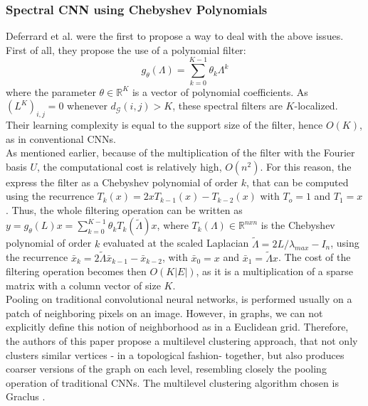 \subsubsection*{Spectral CNN using Chebyshev Polynomials}
Deferrard et al. \cite{defferard} were the first to propose a way to deal with
the above issues.\\
 First of all, they propose the use of a polynomial filter:\\
\begin{equation}
g_{\theta}(\Lambda ) = \sum_{k=0}^{K-1}\theta_k \Lambda^k
\end{equation}
where the parameter $\theta \in \mathbb{R}^K$ is a vector of polynomial
coefficients. As $(L^K)_{i,j} = 0$ whenever $d_{\mathcal{G}}(i,j)>K$, these
spectral filters are $K$-localized.\\
 Their learning complexity is equal to the support
size of the filter, hence $O(K)$, as in conventional CNNs.\\
 As mentioned earlier, because of the
multiplication of the filter with the Fourier basis $U$, the computational cost
is relatively high, $O(n^2)$. For this reason, the express the filter as a
Chebyshev polynomial of order $k$, that can be computed using the recurrence
$T_k(x) = 2xT_{k-1}(x)-T_{k-2}(x)$ with $T_o = 1$ and $T_1 = x$. Thus, the whole
filtering operation can be written as $y = g_{\theta}(L)x =
\sum_{k=0}^{K-1}\theta_k T_k (\widetilde{\Lambda })x$, where $T_k (\Lambda ) \in
\mathbb{R}^{nxn}$ is the Chebyshev polynomial of order $k$ evaluated at the
scaled Laplacian $\widetilde{\Lambda} = 2L/\lambda_{max} - I_n$, using the
recurrence $\bar{x}_k = 2\widetilde{\Lambda}\bar{x}_{k-1} - \bar{x}_{k-2}$, with
$\bar{x}_0 = x$ and $\bar{x}_1 = \widetilde{\Lambda}x$. The cost of the
filtering operation becomes then $O(K|E|)$, as it is a multiplication of a
sparse matrix with a column vector of size $K$.\\
Pooling on traditional convolutional neural networks, is performed usually on a
patch of neighboring pixels on an image. However, in graphs, we can not explicitly
define this notion of neighborhood as in a Euclidean grid. Therefore, the authors of
this paper propose a multilevel clustering approach, that not only clusters
similar vertices - in a topological fashion- together, but also produces coarser
versions of the graph on each level, resembling closely the pooling operation of traditional
CNNs. The multilevel clustering algorithm chosen is Graclus \cite{Kulis}.\\
